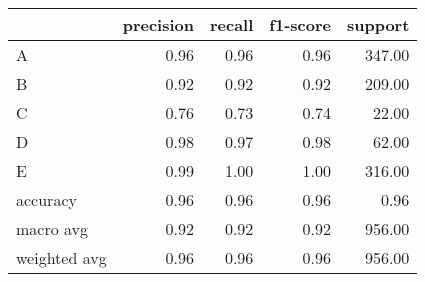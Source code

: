\begin{tabular}{|l|r|r|r|r|}
\hline
{} &  precision &  recall &  f1-score &  support \\
\hline
A            &       0.96 &    0.96 &      0.96 &   347.00 \\
B            &       0.92 &    0.92 &      0.92 &   209.00 \\
C            &       0.76 &    0.73 &      0.74 &    22.00 \\
D            &       0.98 &    0.97 &      0.98 &    62.00 \\
E            &       0.99 &    1.00 &      1.00 &   316.00 \\
accuracy     &       0.96 &    0.96 &      0.96 &     0.96 \\
macro avg    &       0.92 &    0.92 &      0.92 &   956.00 \\
weighted avg &       0.96 &    0.96 &      0.96 &   956.00 \\
\hline
\end{tabular}
